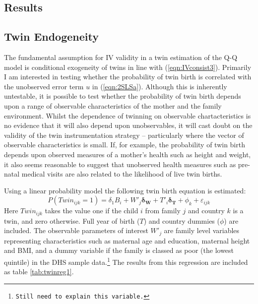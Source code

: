 \documentclass{article}[11pt,subeqn]
\newcommand{\vect}[1]{\mathbf{#1}}
\begin{document}
\begin{spacing}{1.25}
  
\section{Results}
\label{scn:results}
\subsection{Twin Endogeneity}
\label{scn:twinendog}
The fundamental assumption for IV validity in a twin estimation of the Q-Q model is conditional exogeneity of twins in line with (\ref{eqn:IVconsist3}).
Primarily I am interested in testing whether the probability of twin birth is correlated with the unobserved error term $u$ in (\ref{eqn:2SLSa}).  
Although this is inherently untestable, it is possible to test whether the probability of twin birth depends upon a range of observable characteristics 
of the mother and the family environment.  Whilst the dependence of twinning on observable chartacteristics is no evidence that it will also 
depend upon unobservables, it will cast doubt on the validity of the twin instrumentation strategy -- particularly where the vector of observable 
characteristics is small.  If, for example, the probability of twin birth depends upon observed measures of a mother's health such as height and weight, 
it also seems reasonable to suggest that unobserved health measures such as pre-natal medical visits are also related to the likelihood of live twin births. 
 
Using a linear probability model the following twin birth equation is estimated: 
\begin{equation}
\label{eqn:twinpred}
P(Twin_{ijk}=1)=\delta_1 B_i + W'_j\vect{\delta_\vect{W}}+ T'_{i}\vect{\delta_\vect{T}} +  \phi_k + \varepsilon_{ijk}
\end{equation}
Here $Twin_{ijk}$ takes the value one if the child $i$ from family $j$ and country $k$ is a twin, and zero otherwise.  Full year of birth ($T$) and country
dummies ($\phi$) are included.  The observable parameters of interest $W'_j$ are family level variables representing characteristics such as maternal age and
education, maternal height and BMI, and a dummy variable if the family is classed as poor (the lowest quintile) in the DHS sample data.\footnote{\texttt{Still 
need to explain this variable.}}  The results from this regression are included as table \ref{tab:twinreg1}.


\end{spacing}
\end{document}
